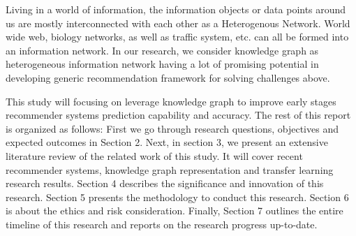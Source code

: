Living in a world of information, the information objects or data points around us are mostly interconnected with each other as a Heterogenous Network. World wide web, biology networks, as well as traffic system, etc. can all be formed into an information network. In our research, we consider knowledge graph as heterogeneous information network having a lot of promising potential in developing generic recommendation framework for solving challenges above.

This study will focusing on leverage knowledge graph to improve early stages recommender systems prediction capability and accuracy. The rest of this report is organized as follows: 
First we go through research questions, objectives and expected outcomes in Section 2. Next, in section 3, we present an extensive literature review of the related work of this study. It will cover recent recommender systems, knowledge graph representation and transfer learning research results. Section 4 describes the significance and innovation of this research. Section 5 presents the methodology to conduct this research. Section 6 is about the ethics and risk consideration. Finally, Section 7 outlines the entire timeline of this research and reports on the research progress up-to-date.


